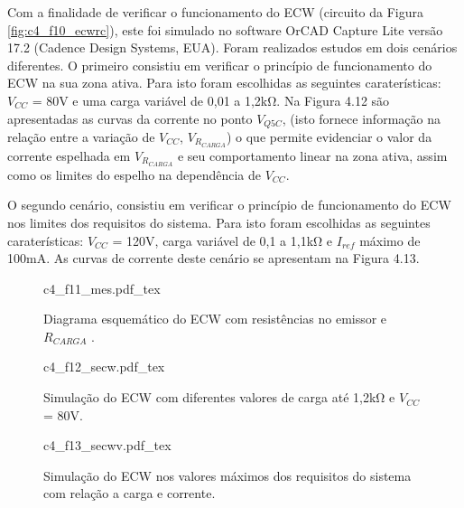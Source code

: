 Com a finalidade de verificar o funcionamento do \acrshort{ECW} (circuito da Figura \ref{fig:c4_f10_ecwrc}), este foi simulado no software OrCAD Capture Lite versão 17.2 (Cadence Design Systems, EUA). Foram realizados estudos em dois cenários diferentes. O primeiro consistiu em verificar o princípio de funcionamento do \acrshort{ECW} na sua zona ativa. Para isto foram escolhidas as seguintes caraterísticas: $V_{CC}$ = 80V e uma carga variável de 0,01 a 1,2k$\mathrm{\Omega}$. Na Figura 4.12 são apresentadas as curvas da corrente no ponto $V_{Q5C}$, (isto fornece informação na relação entre a variação de $V_{CC}$, $V_{R_{CARGA}}$) o que permite evidenciar o valor da corrente espelhada em $V_{R_{CARGA}}$ e seu comportamento linear na zona ativa, assim como os limites do espelho na dependência de $V_{CC}$. 

O segundo cenário, consistiu em verificar o princípio de funcionamento do \acrshort{ECW} nos limites dos requisitos do sistema. Para isto foram escolhidas as seguintes caraterísticas: $V_{CC}$ = 120V, carga variável de 0,1 a 1,1k$\mathrm{\Omega}$ e $I_{ref}$ máximo de 100mA. As curvas de corrente deste cenário se apresentam na Figura 4.13.
 
\begin{figure}
    \centering %
    \small %
    \def\svgwidth{1\columnwidth}%
    {c4_f11_mes.pdf_tex}
    \caption{Diagrama esquemático do \acrshort{ECW} com resistências no emissor e $R_{CARGA}$  \cite{NacimentoJunqueira2003}.}
    \label{fig:c4_f11_mes}
\end{figure}


\begin{figure}
    \centering %
    \small %
    \def\svgwidth{0.9\columnwidth}%
    {c4_f12_secw.pdf_tex}
    \caption{Simulação do \acrshort{ECW} com diferentes valores de carga até 1,2k$\mathrm{\Omega}$ e $V_{CC}$ = 80V.}
    \label{fig:c4_f12_secw}
\end{figure}


\begin{figure}
    \centering %
    \small %
    \def\svgwidth{0.9\columnwidth}%
    {c4_f13_secwv.pdf_tex}
    \caption{Simulação do \acrshort{ECW} nos valores máximos dos requisitos do sistema com relação a carga e corrente.}
    \label{fig:c4_f13_secwv}
\end{figure}

